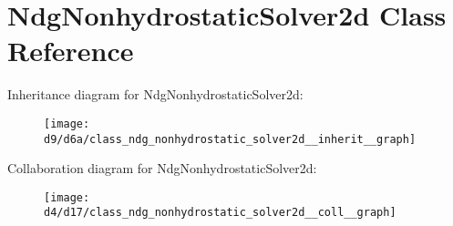 \hypertarget{class_ndg_nonhydrostatic_solver2d}{}\section{Ndg\+Nonhydrostatic\+Solver2d Class Reference}
\label{class_ndg_nonhydrostatic_solver2d}


Inheritance diagram for Ndg\+Nonhydrostatic\+Solver2d\+:
\nopagebreak
\begin{figure}[H]
\begin{center}
\leavevmode
\texttt{[image: d9/d6a/class\_ndg\_nonhydrostatic\_solver2d\_\_inherit\_\_graph]}
\end{center}
\end{figure}


Collaboration diagram for Ndg\+Nonhydrostatic\+Solver2d\+:
\nopagebreak
\begin{figure}[H]
\begin{center}
\leavevmode
\texttt{[image: d4/d17/class\_ndg\_nonhydrostatic\_solver2d\_\_coll\_\_graph]}
\end{center}
\end{figure}
